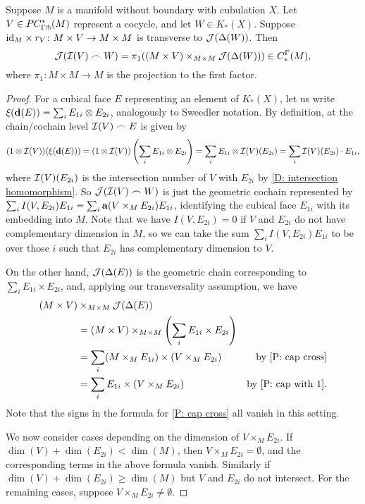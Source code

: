 \begin{lemma}\label{L: image of cubical cap}
	Suppose $M$ is a manifold without boundary with cubulation $X$.
	Let $V \in PC^*_{\Gamma\pitchfork}(M)$ represent a cocycle, and let $W \in K_*(X)$.
	Suppose $\mathrm{id}_M \times r_V \colon M \times V \to M \times M$ is transverse to $\mathcal{J}(\Delta(W))$.
	Then $$\mathcal{J}(\mathcal{I}(V)\frown W) = \pi_1( (M \times V)\times_{M \times M}\mathcal{J}(\Delta(W))) \in C_*^\Gamma(M),$$
	where $\pi_1 \colon M \times M \to M$ is the projection to the first factor.
\end{lemma}

\begin{proof}
	For a cubical face $E$ representing an element of $K_*(X)$, let us write $\xi(\mathbf{d} (E)) = \sum_i E_{1i} \otimes E_{2i}$, analogously to Sweedler notation.
	By definition, at the chain/cochain level $\mathcal{I}(V)\frown E$ is given by
	$$(1 \otimes \mathcal{I}(V))(\xi(\mathbf{d} (E))) = (1 \otimes \mathcal{I}(V))\left(\sum_i E_{1i} \otimes E_{2i}\right) = \sum_i E_{1i} \otimes \mathcal{I}(V)(E_{2i}) = \sum_i \mathcal{I}(V)(E_{2i})\cdot E_{1i},$$
	where $\mathcal{I}(V)(E_{2i})$ is the intersection number of $V$ with $E_{2i}$ by \cref{D: intersection homomorphism}.
	So $\mathcal{J}(\mathcal{I}(V)\frown W)$ is just the geometric cochain represented by $\sum_i I(V,E_{2i})E_{1i} = \sum_i \mathbf{a}(V \times_M E_{2i})E_{1i} $, identifying the cubical face $E_{1i}$ with its embedding into $M$.
	Note that we have $I(V,E_{2i}) = 0$ if $V$ and $E_{2i}$ do not have complementary dimension in $M$, so we can take the sum $\sum_i I(V,E_{2i})E_{1i}$ to be over those $i$ such that $E_{2i}$ has complementary dimension to $V$.

	On the other hand, $\mathcal{J}(\Delta(E))$ is the geometric chain corresponding to $\sum_i E_{1i} \times E_{2i}$, and, applying our transversality assumption, we have
	\begin{align*}
		(M \times V)&\times_{M \times M}\mc J(\Delta(E))\\
		& = (M \times V)\times_{M \times M}\left(\sum_i E_{1i} \times E_{2i}\right)\\
		& = \sum_i (M \times_M E_{1i}) \times (V \times_M E_{2i})&\text{by \cref{P: cap cross}}\\
		& = \sum_i E_{1i} \times (V \times_M E_{2i})&\text{by \cref{P: cap with 1}}.
	\end{align*}
	Note that the signs in the formula for \cref{P: cap cross} all vanish in this setting.

	We now consider cases depending on the dimension of $V \times_M E_{2i}$.
	If $\dim(V)+\dim(E_{2i})<\dim (M)$, then $V \times_M E_{2i} = \emptyset$, and the corresponding terms in the above formula vanish.
	Similarly if $\dim(V)+\dim(E_{2i})\geq \dim (M)$ but $V$ and $E_{2i}$ do not intersect.
	For the remaining cases, suppose
	$V \times_M E_{2i}\neq \emptyset$.


\end{proof}
